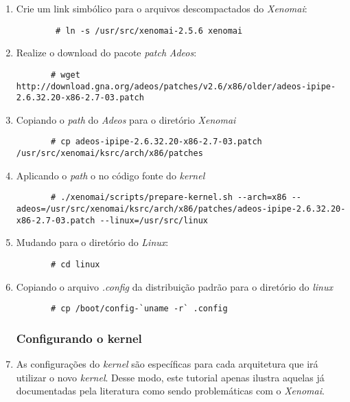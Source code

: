 \documentclass[a4paper,10pt]{article}
\begin{document}
\begin{enumerate}
	\item Crie um link simbólico para o arquivos descompactados do \emph{Xenomai}:
	  \begin{lstlisting}
	    # ln -s /usr/src/xenomai-2.5.6 xenomai
	  \end{lstlisting}

	\item Realize o download do pacote \emph{patch} \emph{Adeos}:
	  \begin{lstlisting}
	   # wget http://download.gna.org/adeos/patches/v2.6/x86/older/adeos-ipipe-2.6.32.20-x86-2.7-03.patch
	  \end{lstlisting}

	\item Copiando o \emph{path} do \emph{Adeos} para o diretório \emph{Xenomai}
	  \begin{lstlisting}
	   # cp adeos-ipipe-2.6.32.20-x86-2.7-03.patch /usr/src/xenomai/ksrc/arch/x86/patches
	  \end{lstlisting}

	\item Aplicando o \emph{path} o no código fonte do \emph{kernel}
	  \begin{lstlisting}
	   # ./xenomai/scripts/prepare-kernel.sh --arch=x86 --adeos=/usr/src/xenomai/ksrc/arch/x86/patches/adeos-ipipe-2.6.32.20-x86-2.7-03.patch --linux=/usr/src/linux
	  \end{lstlisting}

	\item Mudando para o diretório do \emph{Linux}:
	  \begin{lstlisting}
	   # cd linux
	  \end{lstlisting}

	\item Copiando o arquivo \emph{.config} da distribuição padrão para o diretório do \emph{linux}
	  \begin{lstlisting}
	   # cp /boot/config-`uname -r` .config
	  \end{lstlisting}
      
     \subsubsection{Configurando o kernel}

	\item As configurações do \emph{kernel} são específicas para cada arquitetura que irá utilizar o novo \emph{kernel}. 
	  Desse modo, este tutorial apenas ilustra aquelas já documentadas pela literatura como sendo problemáticas 
	  com o \emph{Xenomai}.
	

\end{enumerate}
\end{document}

